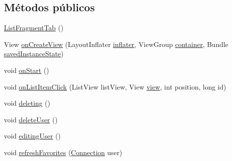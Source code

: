\subsection*{Métodos públicos}
\begin{DoxyCompactItemize}
\item 
\hyperlink{classes_1_1ucm_1_1tfg_1_1controlremotolinux_1_1client_1_1controller_1_1ListFragmentTab_a2e3014f0a04e1861ef69054c3fc041e3}{List\-Fragment\-Tab} ()
\item 
View \hyperlink{classes_1_1ucm_1_1tfg_1_1controlremotolinux_1_1client_1_1controller_1_1ListFragmentTab_a4c1dd7b59f14dd95515f4db74ad2cf1b}{on\-Create\-View} (Layout\-Inflater \hyperlink{classes_1_1ucm_1_1tfg_1_1controlremotolinux_1_1client_1_1controller_1_1ListFragmentTab_aa372f69bd7e7da9ef5e3bffdebcf78ed}{inflater}, View\-Group \hyperlink{classes_1_1ucm_1_1tfg_1_1controlremotolinux_1_1client_1_1controller_1_1ListFragmentTab_a147ddae2b70e8a0de2bda68af01a002c}{container}, Bundle \hyperlink{classes_1_1ucm_1_1tfg_1_1controlremotolinux_1_1client_1_1controller_1_1ListFragmentTab_a236516cfdd7813ca1c9e279b1b08a0ab}{saved\-Instance\-State})
\item 
void \hyperlink{classes_1_1ucm_1_1tfg_1_1controlremotolinux_1_1client_1_1controller_1_1ListFragmentTab_a240a2fd2a0fc1373c8c7632f295d5038}{on\-Start} ()
\item 
void \hyperlink{classes_1_1ucm_1_1tfg_1_1controlremotolinux_1_1client_1_1controller_1_1ListFragmentTab_ade03756c33289af91ac1b5bb703ce258}{on\-List\-Item\-Click} (List\-View list\-View, View \hyperlink{classes_1_1ucm_1_1tfg_1_1controlremotolinux_1_1client_1_1controller_1_1ListFragmentTab_a5f74d138ac1ed74151d7d7bc926520c7}{view}, int position, long id)
\item 
void \hyperlink{classes_1_1ucm_1_1tfg_1_1controlremotolinux_1_1client_1_1controller_1_1ListFragmentTab_a744243297b77e2259211a5ac58145f99}{deleting} ()
\item 
void \hyperlink{classes_1_1ucm_1_1tfg_1_1controlremotolinux_1_1client_1_1controller_1_1ListFragmentTab_a9fde5576ec619e45bb22808e5740653b}{delete\-User} ()
\item 
void \hyperlink{classes_1_1ucm_1_1tfg_1_1controlremotolinux_1_1client_1_1controller_1_1ListFragmentTab_a14e5c3b1a3cbe9dd6070c4379adfd3d5}{editing\-User} ()
\item 
void \hyperlink{classes_1_1ucm_1_1tfg_1_1controlremotolinux_1_1client_1_1controller_1_1ListFragmentTab_ac8ca2db1392dc64a1a313d4f8d6c8f1c}{refresh\-Favorites} (\hyperlink{classes_1_1ucm_1_1tfg_1_1controlremotolinux_1_1client_1_1model_1_1sql_1_1Connection}{Connection} user)
\end{DoxyCompactItemize}
